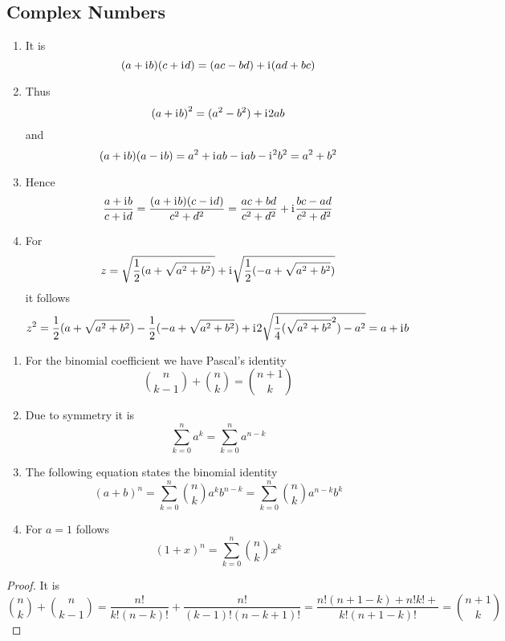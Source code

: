 \subsection{Complex Numbers}

\begin{lemma}\hfill
    \begin{enumerate}
        \item It is
            \[
                (a + \mathrm{i}\mkern1mu b) (c + \mathrm{i}\mkern1mu d) = (ac - bd) + \mathrm{i}\mkern1mu (ad + bc)
            \]
        \item Thus
            \[
               {(a + \mathrm{i}\mkern1mu b)}^2 = (a^2 - b^2) + \mathrm{i}\mkern1mu 2ab
            \]
            and
            \[
                (a + \mathrm{i}\mkern1mu b) (a - \mathrm{i}\mkern1mu b) =  a^2 + \mathrm{i}\mkern1mu ab - \mathrm{i}\mkern1mu ab - \mathrm{i}\mkern1mu^2b^2 = a^2 + b^2
            \]
        \item Hence
            \[
                \frac{a + \mathrm{i}\mkern1mu b}{c + \mathrm{i}\mkern1mu d} = \frac{(a + \mathrm{i}\mkern1mu b)(c - \mathrm{i}\mkern1mu d)}{c^2 + d^2} = 
                    \frac{ac + bd}{c^2 + d^2} + \mathrm{i}\mkern1mu \frac{bc - ad}{c^2 + d^2}
            \]
        \item For 
            \[
                z = \sqrt{\frac{1}{2}(a + \sqrt{a^2 + b^2})} + \mathrm{i}\mkern1mu \sqrt{\frac{1}{2}(-a + \sqrt{a^2 + b^2})} 
            \]
            it follows
            \[
                z^2 = \frac{1}{2}(a + \sqrt{a^2 + b^2}) - \frac{1}{2}(-a + \sqrt{a^2 + b^2}) +
                    \mathrm{i}\mkern1mu 2\sqrt{\frac{1}{4} (\sqrt{a^2 + b^2}^2) - a^2} = a + \mathrm{i}\mkern1mu b
            \]
    \end{enumerate}
\end{lemma}
\bigskip

\begin{lemma}\hfill
    \begin{enumerate}
        \item For the binomial coefficient we have Pascal's identity
			\[
				\binom{n}{k - 1} + \binom{n}{k} = \binom{n + 1 }{k }   
			\]  
        \item Due to symmetry it is	
			\[
				\sum_{k=0}^{n} a^{k} = \sum_{k=0}^{n} a^{n - k}
			\]  
        \item The following equation states the binomial identity
			\[
				{(a + b)}^n = \sum_{k=0}^{n} \binom{n}{k} a^{k} b^{n - k} = \sum_{k=0}^{n} \binom{n}{k} a^{n -k} b^{k}
			\]  
        \item For \( a = 1 \) follows
			\[
				{(1 + x)}^n = \sum_{k=0}^{n} \binom{n}{k} x^{k}
			\]  
    \end{enumerate}
\end{lemma}

\begin{proof}
It is
\[
		\binom{n}{k} + \binom{n}{k - 1} = \frac{n!}{k!(n - k)!} + \frac{n!}{(k - 1)!(n - k + 1)!} 
			 = \frac{n!(n + 1 - k) + n!k! + }{k!(n + 1- k)!}
			 = \binom{n + 1}{k}
\]
\end{proof}
\bigskip
